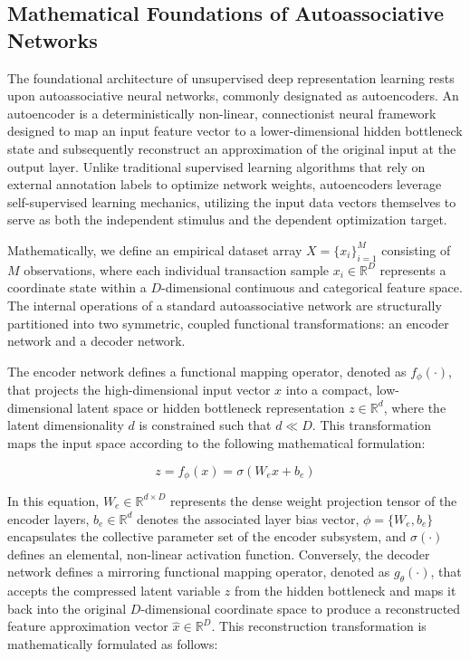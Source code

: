 \documentclass[11pt,a4paper]{report}
\begin{document}
\subsection{Mathematical Foundations of Autoassociative Networks}
The foundational architecture of unsupervised deep representation learning rests upon autoassociative neural networks, commonly designated as autoencoders. An autoencoder is a deterministically non-linear, connectionist neural framework designed to map an input feature vector to a lower-dimensional hidden bottleneck state and subsequently reconstruct an approximation of the original input at the output layer. Unlike traditional supervised learning algorithms that rely on external annotation labels to optimize network weights, autoencoders leverage self-supervised learning mechanics, utilizing the input data vectors themselves to serve as both the independent stimulus and the dependent optimization target. 

Mathematically, we define an empirical dataset array $X=\{x_{i}\}_{i=1}^{M}$ consisting of $M$ observations, where each individual transaction sample $x_{i}\in\mathbb{R}^{D}$ represents a coordinate state within a $D$-dimensional continuous and categorical feature space. The internal operations of a standard autoassociative network are structurally partitioned into two symmetric, coupled functional transformations: an encoder network and a decoder network. 

The encoder network defines a functional mapping operator, denoted as $f_{\phi}(\cdot)$, that projects the high-dimensional input vector $x$ into a compact, low-dimensional latent space or hidden bottleneck representation $z\in\mathbb{R}^{d}$, where the latent dimensionality $d$ is constrained such that $d\ll D$. This transformation maps the input space according to the following mathematical formulation:

\begin{equation}
z=f_{\phi}(x)=\sigma(W_{e}x+b_{e})
\end{equation}

In this equation, $W_{e}\in\mathbb{R}^{d\times D}$ represents the dense weight projection tensor of the encoder layers, $b_{e}\in\mathbb{R}^{d}$ denotes the associated layer bias vector, $\phi=\{W_{e},b_{e}\}$ encapsulates the collective parameter set of the encoder subsystem, and $\sigma(\cdot)$ defines an elemental, non-linear activation function. Conversely, the decoder network defines a mirroring functional mapping operator, denoted as $g_{\theta}(\cdot)$, that accepts the compressed latent variable $z$ from the hidden bottleneck and maps it back into the original $D$-dimensional coordinate space to produce a reconstructed feature approximation vector $\hat{x}\in\mathbb{R}^{D}$. This reconstruction transformation is mathematically formulated as follows:
\end{document}
